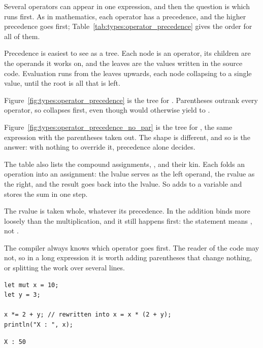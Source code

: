Several operators can appear in one expression, and then the question is which
runs first. As in mathematics, each operator has a precedence, and the higher
precedence goes first; Table~\ref{tab:types:operator_precedence} gives the order
for all of them.

Precedence is easiest to see as a tree. Each node is an operator, its children
are the operands it works on, and the leaves are the values written in the source
code. Evaluation runs from the leaves upwards, each node collapsing to a single
value, until the root is all that is left.

Figure~\ref{fig:types:operator_precedence} is the tree for
. Parentheses outrank every operator, so 
collapses first, even though \token{-} would otherwise yield to \token{*}.



Figure~\ref{fig:types:operator_precedence_no_par} is the tree for
, the same expression with the parentheses taken out. The
shape is different, and so is the answer: with nothing to override it, precedence
alone decides.



The table also lists the compound assignments, \token{+=}, \token{-=} and their
kin. Each folds an operation into an assignment: the lvalue serves as the left
operand, the rvalue as the right, and the result goes back into the lvalue. So
\token{+=} adds to a variable and stores the sum in one step.

The rvalue is taken whole, whatever its precedence. In  the
addition binds more loosely than the multiplication, and it still happens first:
the statement means , not .

The compiler always knows which operator goes first. The reader of the code may
not, so in a long expression it is worth adding parentheses that change nothing,
or splitting the work over several lines.

\begin{lstlisting}[style=coloredverbatim]
let mut x = 10;
let y = 3;

x *= 2 + y; // rewritten into x = x * (2 + y);
println("X : ", x);
\end{lstlisting}
\vspace{-10pt}%
\begin{lstlisting}[style=bashVerb]
X : 50
\end{lstlisting}


